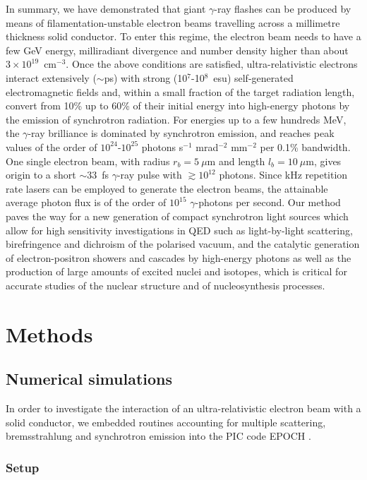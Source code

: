 \documentclass[fleqn,11pt]{wlscirep}
\begin{document}
In summary, we have demonstrated that giant $\gamma$-ray flashes can be produced by means of filamentation-unstable electron beams travelling across a millimetre thickness solid conductor. 
To enter this regime, the electron beam needs to have a few GeV energy, milliradiant divergence and number density higher than about $3\times10^{19}$~cm$^{-3}$. 
Once the above conditions are satisfied, ultra-relativistic electrons interact extensively ($\sim$ps) with strong (10$^7$-10$^8$~esu) self-generated electromagnetic fields and, within a small fraction of the target radiation length, convert from 10\% up to 60\% of their initial energy into high-energy photons by the emission of synchrotron radiation. 
For energies up to a few hundreds MeV, the $\gamma$-ray brilliance is dominated by synchrotron emission, and reaches peak values of the order of $10^{24}$-$10^{25}$ photons s$^{-1}$ mrad$^{-2}$ mm$^{-2}$ per 0.1\% bandwidth. One single electron beam, with radius $r_b=5~\mu$m and length $l_b=10~\mu$m, gives origin to a short $\sim33$~fs $\gamma$-ray pulse with $\gtrsim10^{12}$ photons. Since kHz repetition rate lasers can be employed to generate the electron beams, the attainable average photon flux is of the order of $10^{15}$ $\gamma$-photons per second. Our method paves the way for a new generation of compact synchrotron light sources which allow for high sensitivity investigations in QED such as light-by-light scattering, birefringence and dichroism of the polarised vacuum, and the catalytic generation of electron-positron showers and cascades by high-energy photons as well as the production of large amounts of excited nuclei and isotopes, which is critical for accurate studies of the nuclear structure and of nucleosynthesis processes.


\section*{Methods}\label{methods}

\subsection*{Numerical simulations}

In order to investigate the interaction of an ultra-relativistic electron beam with a solid conductor, we embedded routines accounting for multiple scattering, bremsstrahlung and synchrotron emission into the PIC code EPOCH \cite{Arber:2015hc}.

\subsubsection*{Setup}
\end{document}
